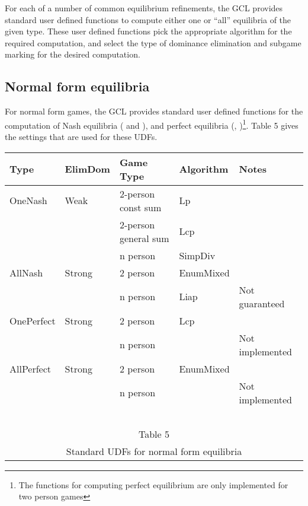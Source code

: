 For each of a number of common equilibrium refinements, the GCL
provides standard user defined functions to compute either one or ``all''
equilibria of the given type.  These user defined functions pick the
appropriate algorithm for the required computation, and select the
type of dominance elimination and subgame marking for the desired
computation.

\subsection{Normal form equilibria}

For normal form games, the GCL provides standard user defined
functions for the computation of Nash equilibria ( and ), and perfect
equilibria (, )\footnote{The
functions for computing perfect equilibrium are only implemented for
two person games}.  Table 5 gives the settings that are used for these
UDFs.

\medskip
\begin{center}
\begin{tabular}{|l|l|p{2cm}|l|l|}
\hline
Type & ElimDom & Game Type & Algorithm & Notes \\
\hline
OneNash & Weak & 2-person const sum & Lp & \\ \cline{3-5}
        &      & 2-person general  sum & Lcp& \\ \cline{3-5}
        &      & n person              & SimpDiv & \\
\hline
AllNash & Strong & 2 person       & EnumMixed & \\ \cline{3-5}
        &        & n person       & Liap      & Not guaranteed\\
\hline
\hline
OnePerfect & Strong & 2 person     & Lcp    & \\ \cline{3-5}
           &        & n person     &     &Not implemented  \\
\hline
AllPerfect & Strong & 2 person      & EnumMixed & \\ \cline{3-5}
           &        & n person      &     & Not implemented\\
\hline
\multicolumn{5}{c}{\ }\\
\multicolumn{5}{c}{Table 5}\\
\multicolumn{5}{c}{Standard UDFs for normal form equilibria}\\
\end{tabular}
\end{center}
\medskip


